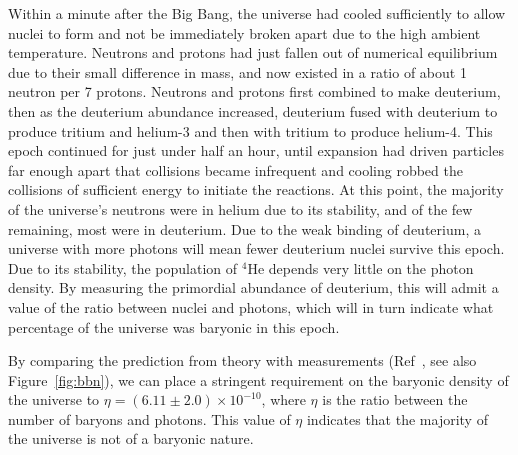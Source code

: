 Within a minute after the Big Bang, the universe had cooled sufficiently to allow nuclei to form and not be immediately broken apart due to the high ambient temperature. Neutrons and protons had just fallen out of numerical equilibrium due to their small difference in mass, and now existed in a ratio of about 1 neutron per 7 protons. Neutrons and protons first combined to make deuterium, then as the deuterium abundance increased, deuterium fused with deuterium to produce tritium and helium-3 and then with tritium to produce helium-4. This epoch continued for just under half an hour, until expansion had driven particles far enough apart that collisions became infrequent and cooling robbed the collisions of sufficient energy to initiate the reactions. At this point, the majority of the universe's neutrons were in helium due to its stability, and of the few remaining, most were in deuterium. Due to the weak binding of deuterium, a universe with more photons will mean fewer deuterium nuclei survive this epoch. Due to its stability, the population of $^4$He depends very little on the photon density. By measuring the primordial abundance of deuterium, this will admit a value of the ratio between nuclei and photons, which will in turn indicate what percentage of the universe was baryonic in this epoch.

By comparing the prediction from theory with measurements (Ref~\cite{Steigman:2007xt}, see also Figure~\ref{fig:bbn}), we can place a stringent requirement on the baryonic density of the universe to $\eta = (6.11\pm2.0)\times10^{-10}$, where $\eta$ is the ratio between the number of baryons and photons. This value of $\eta$ indicates that the majority of the universe is not of a baryonic nature.

